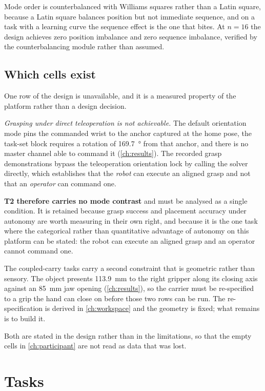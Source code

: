 Mode order is counterbalanced with Williams squares rather than a Latin
square, because a Latin square balances position but not immediate sequence,
and on a task with a learning curve the sequence effect is the one that bites.
At $n = 16$ the design achieves zero position imbalance and zero sequence
imbalance, verified by the counterbalancing module rather than assumed.

\subsection{Which cells exist}
\label{sec:cells}

One row of the design is unavailable, and it is a measured property of the
platform rather than a design decision.

\emph{Grasping under direct teleoperation is not achievable.} The default
orientation mode pins the commanded wrist to the anchor captured at the home
pose, the task-set block requires a rotation of \SI{169.7}{\degree} from that
anchor, and there is no master channel able to command it
(\cref{ch:results}). The recorded grasp demonstrations bypass the
teleoperation orientation lock by calling the solver directly, which
establishes that the \emph{robot} can execute an aligned grasp and not that an
\emph{operator} can command one.

\textbf{T2 therefore carries no mode contrast} and must be analysed as a
single condition. It is retained because grasp success and placement accuracy
under autonomy are worth measuring in their own right, and because it is the
one task where the categorical rather than quantitative advantage of autonomy
on this platform can be stated: the robot can execute an aligned grasp and an
operator cannot command one.

The coupled-carry tasks carry a second constraint that is geometric rather
than sensory. The object presents \SI{113.9}{\milli\metre} to the right
gripper along its closing axis against an \SI{85}{\milli\metre} jaw opening
(\cref{ch:results}), so the carrier must be re-specified to a grip the hand
can close on before those two rows can be run. The re-specification is
derived in \cref{ch:workspace} and the geometry is fixed; what remains is to
build it.

Both are stated in the design rather than in the limitations, so that the
empty cells in \cref{ch:participant} are not read as data that was lost.

\section{Tasks}

